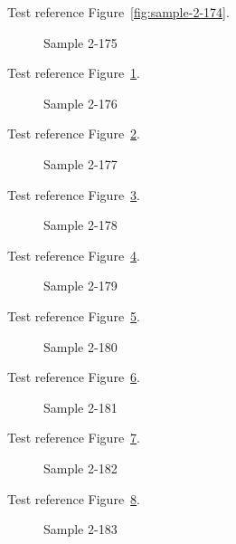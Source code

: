 Test reference Figure~\ref{fig:sample-2-174}.

\begin{figure}[tbhp]
\caption{Sample 2-175}
\label{fig:sample-2-175}
\end{figure}

Test reference Figure~\ref{fig:sample-2-175}.

\begin{figure}[tbhp]
\caption{Sample 2-176}
\label{fig:sample-2-176}
\end{figure}

Test reference Figure~\ref{fig:sample-2-176}.

\begin{figure}[tbhp]
\caption{Sample 2-177}
\label{fig:sample-2-177}
\end{figure}

Test reference Figure~\ref{fig:sample-2-177}.

\begin{figure}[tbhp]
\caption{Sample 2-178}
\label{fig:sample-2-178}
\end{figure}

Test reference Figure~\ref{fig:sample-2-178}.

\begin{figure}[tbhp]
\caption{Sample 2-179}
\label{fig:sample-2-179}
\end{figure}

Test reference Figure~\ref{fig:sample-2-179}.

\begin{figure}[tbhp]
\caption{Sample 2-180}
\label{fig:sample-2-180}
\end{figure}

Test reference Figure~\ref{fig:sample-2-180}.

\begin{figure}[tbhp]
\caption{Sample 2-181}
\label{fig:sample-2-181}
\end{figure}

Test reference Figure~\ref{fig:sample-2-181}.

\begin{figure}[tbhp]
\caption{Sample 2-182}
\label{fig:sample-2-182}
\end{figure}

Test reference Figure~\ref{fig:sample-2-182}.

\begin{figure}[tbhp]
\caption{Sample 2-183}
\label{fig:sample-2-183}
\end{figure}

